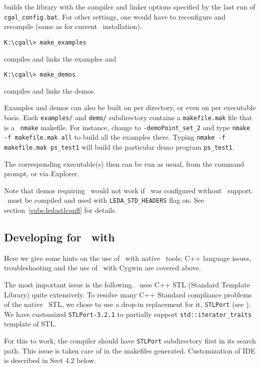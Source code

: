 builds the library with the compiler and linker options specified
by the last run of \texttt{cgal\_config.bat}.
For other settings, one would have to reconfigure and recompile
(same as for current \leda\ installation).
\begin{verbatim}
K:\cgal\> make_examples
\end{verbatim}
compiles and links the examples and
\begin{verbatim}
K:\cgal\> make_demos
\end{verbatim}
compiles and links the demos. 

Examples and demos can also be built on per directory, or even on per
executable basis.  Each \texttt{examples/} and \texttt{demo/}
subdirectory contains a \texttt{makefile.mak} file that is a \mswin\ 
\texttt{nmake} makefile.  For instance, change to
\texttt{\cgal-\cgalrelease\bslsh demo\bslsh Point\_set\_2} and type
\texttt{nmake -f makefile.mak all} to build all the examples there.
Typing \texttt{nmake -f makefile.mak ps\_test1} will build the
particular demo program \texttt{ps\_test1}.

The corresponding executable(s) then can be run as usual, from the
command prompt, or via Explorer.

Note that demos requiring \leda\ would not work if \cgal\ was
configured without \leda\ support.  \leda\ must be compiled and used
with \texttt{LEDA\_STD\_HEADERS} flag on. See
section~\ref{subs:ledastlconfl} for details.


\subsection{Developing for \cgal\ with }

Here we give some hints on the use of \cgal\ with native \msvc\ tools;
C++ language issues, troubleshooting and the use of \cgal\ with Cygwin
are covered above.

The most important issue is the following. \cgal\ uses C++ STL
(Standard Template Library) quite extensively.  To resolve many C++
Standard compliance problems of the native \msvc\ STL, we chose to use
a drop-in replacement for it, \texttt{STLPort} (see \stlportpage). We
have customized \texttt{STLPort-3.2.1} to partially support
\texttt{std::iterator\_traits} template of STL.

For this to work, the compiler should have \texttt{STLPort}
subdirectory first in its search path.  This issue is taken care of in
the makefiles generated.  Customization of IDE is described in Sect
4.2 below.


